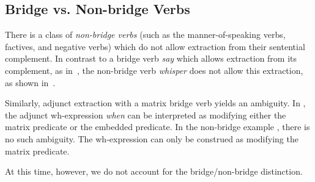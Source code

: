 \subsection{Bridge vs. Non-bridge Verbs}

There is a class of {\it non-bridge verbs} (such as the manner-of-speaking
verbs, factives, and negative verbs) which do not allow extraction from their
sentential complement.  In contrast to a bridge verb {\it say} which allows
extraction from its complement, as in~, the non-bridge verb {\it whisper}
does not allow this extraction, as shown in~.


Similarly, adjunct extraction with a matrix bridge verb yields an ambiguity. In
, the adjunct wh-expression {\it when} can be interpreted as modifying
either the matrix predicate or the embedded predicate. In the non-bridge
example , there is no such ambiguity. The wh-expression can only be
construed as modifying the matrix predicate.


At this time, however,  we do not account for the bridge/non-bridge
distinction. 

%
%
%

